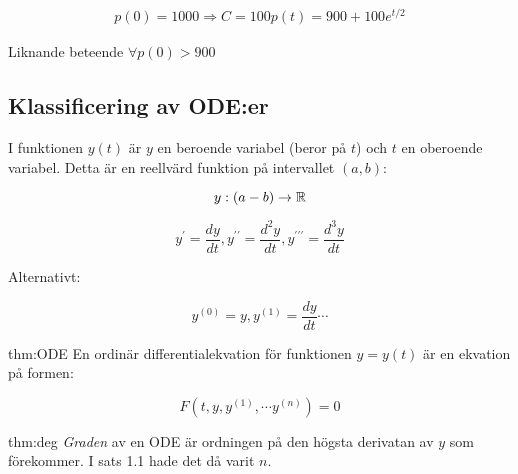 \begin{equation*}
  \begin{split}
    p(0)=1000 \Rightarrow C=100
    p(t)=900+100e^{t/2}
  \end{split}
\end{equation*}
\par\bigskip

Liknande beteende $\forall p(0)>900$
\par\bigskip

\subsection{Klassificering av ODE:er}
\par\bigskip

\noindent I funktionen $y(t)$ är $y$ en beroende variabel (beror på $t$) och $t$ en oberoende variabel. Detta är en reellvärd funktion på intervallet $(a,b)$:

\begin{equation*}
  y:(a-b)\to\mathbb{R}
\end{equation*}

\begin{equation*}
  y^{\prime}=\dfrac{dy}{dt}, y^{\prime\prime}=\dfrac{d^2y}{dt}, y^{\prime\prime\prime}=\dfrac{d^3y}{dt}
\end{equation*}
\par\bigskip
\noindent Alternativt:

\begin{equation*}
  y^{(0)}=y, y^{(1)}=\dfrac{dy}{dt}\cdots
\end{equation*}

\begin{theo}[ODE]{thm:ODE}
  En ordinär differentialekvation för funktionen $y=y(t)$ är en ekvation på formen:

  \begin{equation*}
    F(t,y,y^{(1)}, \cdots y^{(n)}) = 0
  \end{equation*}
  \par\bigskip

\end{theo}
\par\bigskip

\begin{theo}{thm:deg}
  \textit{Graden} av en ODE är ordningen på den högsta derivatan av $y$ som förekommer. I sats 1.1 hade det då varit $n$.
\end{theo}
\par\bigskip

